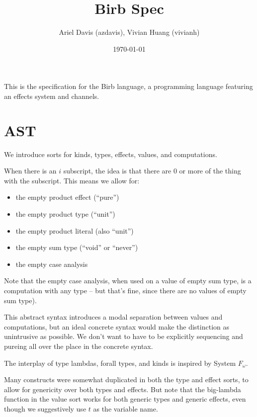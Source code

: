 \documentclass[12pt]{article}
\title{Birb Spec}
\author{Ariel Davis (azdavis), Vivian Huang (vivianh)}
\date{\today}
\begin{document}
\maketitle

This is the specification for the Birb language, a programming language
featuring an effects system and channels.

\newpage
\section{AST}

We introduce sorts for kinds, types, effects, values, and computations.

When there is an $i$ subscript, the idea is that there are 0 or more of the
thing with the subscript. This means we allow for:
\begin{itemize}
\item the empty product effect (``pure'')
\item the empty product type (``unit'')
\item the empty product literal (also ``unit'')
\item the empty sum type (``void'' or ``never'')
\item the empty case analysis
\end{itemize}

Note that the empty case analysis, when used on a value of empty sum type, is a
computation with any type -- but that's fine, since there are no values of empty
sum type).

This abstract syntax introduces a modal separation between values and
computations, but an ideal concrete syntax would make the distinction as
unintrusive as possible. We don't want to have to be explicitly sequencing and
\textsf{pure}ing all over the place in the concrete syntax.

The interplay of type lambdas, forall types, and kinds is inspired by System
$F_\omega$.

Many constructs were somewhat duplicated in both the type and effect sorts, to
allow for genericity over both types and effects. But note that the big-lambda
function in the value sort works for both generic types and generic effects,
even though we suggestively use $t$ as the variable name.
\end{document}
